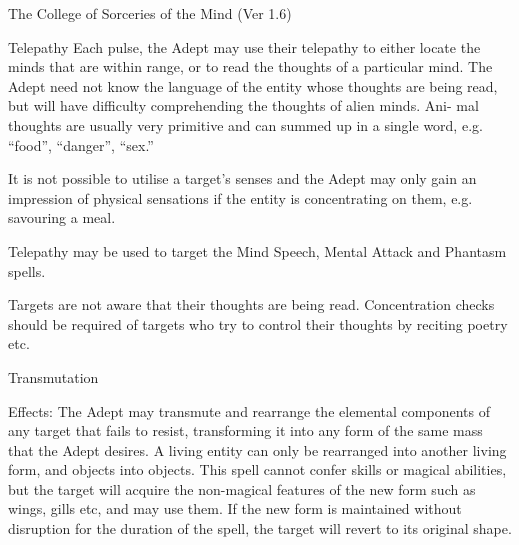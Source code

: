 \begin{Chapter}{The College of Sorceries of the Mind (Ver 1.6)}
\begin{spell}[S-9]{Telepathy }
Each  pulse,  the  Adept  may  use  their  telepathy  to 
either locate the minds that are within range, or to 
read  the  thoughts  of  a  particular  mind.  The  Adept 
need  not  know  the  language  of  the  entity  whose 
thoughts  are  being  read,  but  will  have  difficulty 
comprehending  the  thoughts  of  alien  minds.  Ani-
mal  thoughts  are  usually  very  primitive  and  can 
summed up in a single word, e.g. “food”, “danger”, 
“sex.” 

It is not possible to utilise a target’s senses and the 
Adept  may  only  gain  an  impression  of  physical 
sensations  if  the  entity  is  concentrating  on  them, 
e.g. savouring a meal. 

Telepathy may be used to  target the Mind Speech, 
Mental Attack and Phantasm spells. 

Targets are not aware that their thoughts are being 
read.  Concentration  checks  should  be  required  of 
targets who try to control their thoughts by reciting 
poetry etc. 

\end{spell}

\begin{spell}[S-10]{Transmutation }

Effects:  The  Adept  may  transmute  and  rearrange 
the elemental components of any target that fails to 
resist,  transforming  it  into  any  form  of  the  same 
mass  that  the  Adept  desires.  A  living  entity  can 
only  be  rearranged  into  another  living  form,  and 
objects into objects. This spell cannot confer skills 
or  magical  abilities,  but  the  target  will  acquire  the 
non-magical  features  of  the  new  form  such  as 
wings, gills etc, and may use them. If the new form 
is maintained without disruption for the duration of 
the spell, the target will revert to its original shape. 
\end{spell}

\end{Chapter}
